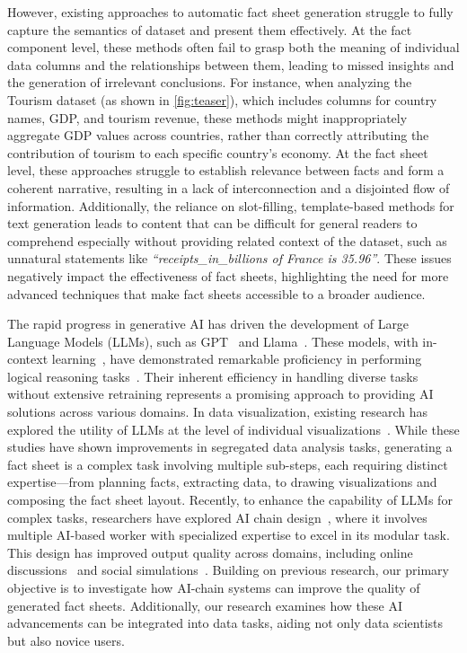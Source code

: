 However, existing approaches to automatic fact sheet generation struggle to fully capture the semantics of dataset and present them effectively. At the fact component level, these methods often fail to grasp both the meaning of individual data columns and the relationships between them, leading to missed insights and the generation of irrelevant conclusions. For instance, when analyzing the Tourism dataset (as shown in \cref{fig:teaser}), which includes columns for country names, GDP, and tourism revenue, these methods might inappropriately aggregate GDP values across countries, rather than correctly attributing the contribution of tourism to each specific country's economy. At the fact sheet level, these approaches struggle to establish relevance between facts and form a coherent narrative, resulting in a lack of interconnection and a disjointed flow of information. Additionally, the reliance on slot-filling, template-based methods for text generation leads to content that can be difficult for general readers to comprehend especially without providing related context of the dataset, such as unnatural statements like \emph{``receipts\_in\_billions of France is 35.96''}. These issues negatively impact the effectiveness of fact sheets, highlighting the need for more advanced techniques that make fact sheets accessible to a broader audience.

The rapid progress in generative AI has driven the development of Large Language Models (LLMs), such as GPT~\cite{openai_2023} and Llama~\cite{touvron2023llama}. These models, with in-context learning~\cite{min2022rethinking}, have demonstrated remarkable proficiency in performing logical reasoning tasks~\cite{chang2023survey}. Their inherent efficiency in handling diverse tasks without extensive retraining represents a promising approach to providing AI solutions across various domains. In data visualization, existing research has explored the utility of LLMs at the level of individual visualizations~\cite{wu2021ai4vis,chat2vis}. While these studies have shown improvements in segregated data analysis tasks, generating a fact sheet is a complex task involving multiple sub-steps, each requiring distinct expertise—from planning facts, extracting data, to drawing visualizations and composing the fact sheet layout. Recently, to enhance the capability of LLMs for complex tasks, researchers have explored AI chain design~\cite{handler2023taxonomy}, where it involves multiple AI-based worker with specialized expertise to excel in its modular task. This design has improved output quality across domains, including online discussions~\cite{dong2024multi} and social simulations~\cite{pang2024self}. Building on previous research, our primary objective is to investigate how AI-chain systems can improve the quality of generated fact sheets. Additionally, our research examines how these AI advancements can be integrated into data tasks, aiding not only data scientists but also novice users.


